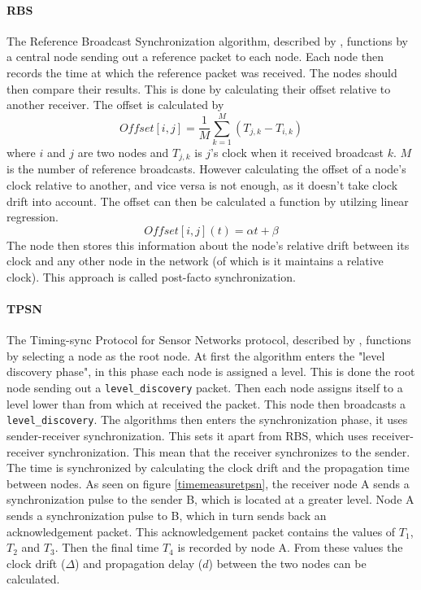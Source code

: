 \documentclass[a4paper,12pt]{article}
\begin{document}
    \paragraph{RBS} The Reference Broadcast Synchronization algorithm, described by \citet{ElsonGirodEstrin02},  functions by a central node sending out a reference packet to each node. Each node then records the time at which the reference packet was received. %
    The nodes should then compare their results. This is done by calculating their offset relative to another receiver. The offset is calculated by 
    \begin{equation}
        \label{offsetcalc}
        \textit{Offset} [i,j] = \frac{1}{M}\sum^M_{k=1} (T_{j,k} - T_{i,k})
    \end{equation}
    where $i$ and $j$ are two nodes and $T_{j,k}$ is $j$'s clock when it received broadcast $k$. $M$ is the number of reference broadcasts.  %
    However calculating the offset of a node's clock relative to another, and vice versa is not enough, as it doesn't take clock drift into account. The offset can then be calculated a function by utilzing linear regression. 
    $$\textit{Offset}[i,j](t) = \alpha t + \beta$$
    The node then stores this information about the node's relative drift between its clock and any other node in the network (of which is it maintains a relative clock). This approach is called post-facto synchronization.
    
    \paragraph{TPSN} The Timing-sync Protocol for Sensor Networks protocol, described by \citet{GaneriwalEtAl03}, functions by selecting a node as the root node. At first the algorithm enters the "level discovery phase", in this  phase each node is assigned a level. This is done the root node sending out a \texttt{level\_discovery} packet. Then each node assigns itself to a level lower than from which at received the packet. This node then broadcasts a \texttt{level\_discovery}. The algorithms then enters the synchronization phase, it uses sender-receiver synchronization. This sets it apart from RBS, which uses receiver-receiver synchronization. This mean that the receiver synchronizes to the sender. The time is synchronized by calculating the clock drift and the propagation time between nodes. As seen on figure \ref{timemeasuretpsn}, the receiver node A sends a synchronization pulse to the sender B, which is located at a greater level. Node A sends a synchronization pulse to B, which in turn sends back an acknowledgement packet. This acknowledgement packet contains the values of $T_1$, $T_2$ and $T_3$. Then the final time $T_4$ is recorded by node A. From these values the clock drift ($\Delta$) and propagation delay ($d$) between the two nodes can be calculated. 
    
\end{document}
